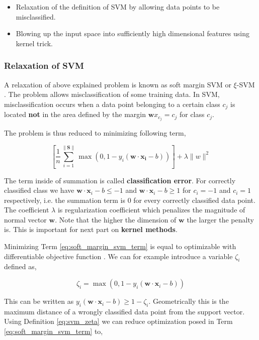 \documentclass[pdftex,12pt,a4paper]{report}
\begin{document}
\begin{itemize}
\item Relaxation of the definition of SVM by allowing data points to be misclassified.
\item Blowing up the input space into sufficiently high dimensional features using kernel trick.
\end{itemize}

\subsubsection*{Relaxation of SVM}

A relaxation of above explained problem is known as soft margin SVM or $\xi$-SVM \cite{cortes1995support}. The problem allows misclassification of some training data. In SVM, misclassification occurs when a data point belonging to a certain class $c_j$ is located \textbf{not} in the area defined by the margin $\mathbf{w} x_{c_j} = c_j$ for class $c_j$.

The problem is thus reduced to minimizing following term,

\begin{equation}
\left[\frac{1}{n} \sum_{i=1}^{\|\mathbf{S}\|} \max\left(0, 1 - y_i(\mathbf{w} \cdot \mathbf{x_i} - b)\right) \right] + \lambda\| w \|^2
\label{eq:soft_margin_svm_term}
\end{equation}

The term inside of summation is called \textbf{classification error}. For correctly classified class we have $\mathbf{w} \cdot \mathbf{x}_i - b \leq -1$ and $\mathbf{w} \cdot \mathbf{x}_i - b \geq 1$ for $c_i = -1$ and $c_i = 1$ respectively, i.e. the summation term is $0$ for every correctly classified data point. The coefficient $\lambda$ is regularization coefficient which penalizes the magnitude of normal vector $\mathbf{w}$. Note that the higher the dimension of $\mathbf{w}$ the larger the penalty is. This is important for next part on \textbf{kernel methods}.

Minimizing Term \ref{eq:soft_margin_svm_term} is equal to optimizable with differentiable objective function \cite{nocedal2006numerical}. We can for example introduce a variable $\zeta_i$ defined as,

\begin{equation}
\zeta_i = \max(0, 1 - y_i(\mathbf{w} \cdot \mathbf{x}_i - b))
\label{eq:svm_zeta}
\end{equation}

This can be written as $y_i(\mathbf{w} \cdot \mathbf{x}_i - b) \geq 1 - \zeta_i$. Geometrically this is the maximum distance of a wrongly classified data point from the support vector. Using Definition \ref{eq:svm_zeta} we can reduce optimization posed in Term \ref{eq:soft_margin_svm_term} to,
\end{document}
